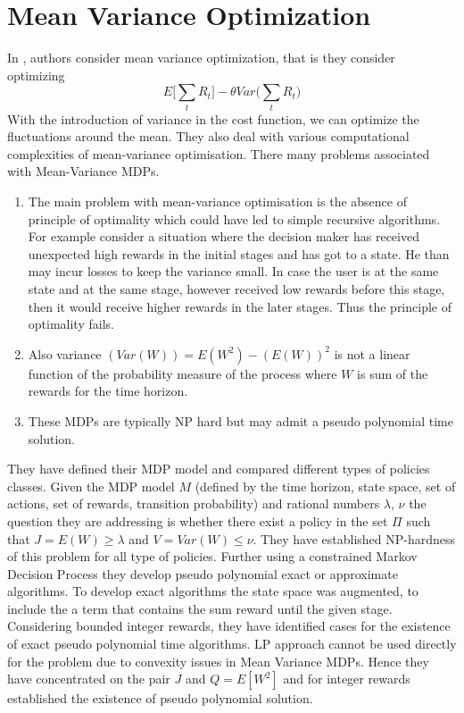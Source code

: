 \documentclass[11pt,a4paper,oneside]{report}
\begin{document}
\section{Mean Variance Optimization}
In \cite{mannor2011mean}, authors consider mean variance optimization, that is they consider optimizing 
\begin{equation}
E\Big[\sum_t R_t\Big] - \theta Var\Big(\sum_t R_t\Big)
\end{equation}
With the introduction of variance in the cost function, we can optimize the fluctuations around the mean. They also deal with various computational complexities of mean-variance optimisation. There many problems associated with Mean-Variance MDPs.
\begin{enumerate}
\item The main problem with mean-variance optimisation is the absence of principle of optimality which could have led to simple recursive algorithms. For example consider a situation where the decision maker has received unexpected high rewards in the initial stages and has got to a state. He than may incur losses to keep the variance small. In case the user is at the same state and at the same stage, however received low rewards before this stage, then it would receive higher rewards in the later stages. Thus the principle of optimality fails. 
\item Also variance $ (Var(W))=E(W^2)- (E(W))^2$ is not a linear function of the probability measure of the process where $W$ is sum of the rewards for the time horizon.
\item These MDPs are typically NP hard but may admit a pseudo polynomial time solution.
\end{enumerate} 
They have defined their MDP model and compared different types of policies classes. Given the MDP model $M$ (defined by the time horizon, state space, set of actions, set of rewards, transition probability) and rational numbers $\lambda$, $\nu$ the question they are addressing is whether there exist a policy in the set  ${\Pi}$ such that $J=E(W)\geq \lambda$ and $V=Var(W)\leq \nu$. They have established NP-hardness of this problem for all type of policies. Further using a constrained Markov Decision Process they develop pseudo polynomial exact or approximate algorithms.
To develop exact algorithms the state space was augmented, to include the a term that contains the sum reward until the given stage. Considering bounded integer rewards, they have identified cases for the existence of exact pseudo polynomial time algorithms. LP approach cannot be used directly for the problem due to convexity issues in Mean Variance MDPs. Hence they have concentrated on the pair $J$ and $Q = E[W^2]$ and for integer rewards established the existence of pseudo polynomial solution.
\end{document}
